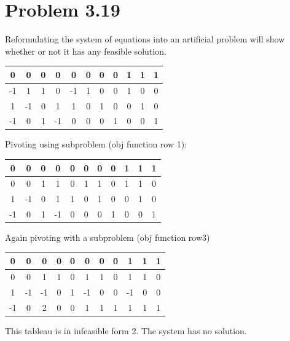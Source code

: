 \documentclass[a4paper,12pt]{article}
\begin{document}
\section*{Problem 3.19}
Reformulating the system of equations into an artificial problem
will show whether or not it has any feasible solution.
\begin{center}
\begin{tabular}{| c | c  c  c  c  c  c  c  c  c  c |}
\hline
0 & 0 & 0 & 0 & 0 & 0 & 0 & 0 & 1 & 1 & 1\\
\hline
-1 & 1 & 1 & 0 & -1 & 1 & 0 & 0 & 1 & 0 & 0\\
1 & -1 & 0 & 1 & 1 & 0 & 1 & 0 & 0 & 1 & 0\\
-1 & 0 & 1 & -1 & 0 & 0 & 0 & 1 & 0 & 0 & 1\\
\hline
\end{tabular}
\end{center}
Pivoting using subproblem (obj function row 1):
\begin{center}
\begin{tabular}{| c | c  c  c  c  c  c  c  c  c  c |}
\hline
0 & 0 & 0 & 0 & 0 & 0 & 0 & 0 & 1 & 1 & 1\\
\hline
0 & 0 & 1 & 1 & 0 & 1 & 1 & 0 & 1 & 1 & 0\\
1 & -1 & 0 & 1 & 1 & 0 & 1 & 0 & 0 & 1 & 0\\
-1 & 0 & 1 & -1 & 0 & 0 & 0 & 1 & 0 & 0 & 1\\
\hline
\end{tabular}
\end{center}
Again pivoting with a subproblem (obj function row3)
\begin{center}
\begin{tabular}{| c | c  c  c  c  c  c  c  c  c  c |}
\hline
0 & 0 & 0 & 0 & 0 & 0 & 0 & 0 & 1 & 1 & 1\\
\hline
0 & 0 & 1 & 1 & 0 & 1 & 1 & 0 & 1 & 1 & 0\\
1 & -1 & -1 & 0 & 1 & -1 & 0 & 0 & -1 & 0 & 0\\
-1 & 0 & 2 & 0 & 0 & 1 & 1 & 1 & 1 & 1 & 1\\
\hline
\end{tabular}
\end{center}
This tableau is in infeasible form 2. The system has no solution.
\end{document}
